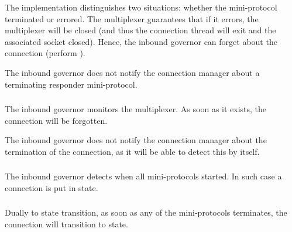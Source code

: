 \begin{detail}
  The implementation distinguishes two situations: whether the mini-protocol
  terminated or errored.  The multiplexer guarantees that if it errors, the
  multiplexer will be closed (and thus the connection thread will exit and the
  associated socket closed).   Hence, the inbound governor can forget about the
  connection
  (perform \MuxTerminated{}).

  The inbound governor does not notify the connection manager about a terminating
  responder mini-protocol.
\end{detail}

\subsubsection{\MuxTerminated}
The inbound governor monitors the multiplexer.  As soon as it exists, the
connection will be forgotten.

The inbound governor does not notify the connection manager about the
termination of the connection, as it will be able to detect this by itself.

\subsubsection{\PromotedToHotRemote}
The inbound governor detects when all \hot{} mini-protocols started.   In such
case a \RemoteWarm{} connection is put in \RemoteHot{} state.

\subsubsection{\DemotedToWarmRemote}
Dually to \PromotedToHotRemote{} state transition, as soon as any of the \hot{}
mini-protocols terminates, the connection will transition to \RemoteWarm{}
state.

